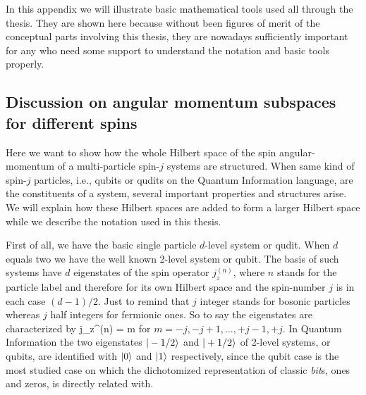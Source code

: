 In this appendix we will illustrate basic mathematical tools used all through the thesis.
They are shown here because without been figures of merit of the conceptual parts involving this thesis, they are nowadays sufficiently important for any who need some support to understand the notation and basic tools properly.

\subsection{Discussion on angular momentum subspaces for different spins}
\label{app:angular-subspaces}

Here we want to show how the whole Hilbert space of the spin angular-momentum of a multi-particle spin-$j$ systems are structured.
When same kind of spin-$j$ particles, i.e., qubits or qudits on the Quantum Information language, are the constituents of a system, several important properties and structures arise.
We will explain how these Hilbert spaces are added to form a larger Hilbert space while we describe the notation used in this thesis.

First of all, we have the basic single particle $d$-level system or qudit.
When $d$ equals two we have the well known 2-level system or qubit.
The basis of such systems have $d$ eigenstates of the spin operator $j_z^{(n)}$, where $n$ stands for the particle label and therefore for its own Hilbert space and the spin-number $j$ is in each case $(d-1)/2$.
Just to remind that $j$ integer stands for bosonic particles whereas $j$ half integers for fermionic ones.
So to say the eigenstates are characterized by
\be
  j_z^{(n)} = m 
\ee
for $m = -j,-j+1,\dots,+j-1,+j$.
In Quantum Information the two eigenstates $\vert -1/2 \rangle$ and $\vert +1/2 \rangle$ of 2-level systems, or qubits, are identified with $\vert 0 \rangle$ and $\vert 1 \rangle$ respectively, since the qubit case is the most studied case on which the dichotomized representation of classic \emph{bit}s, ones and zeros, is directly related with.

